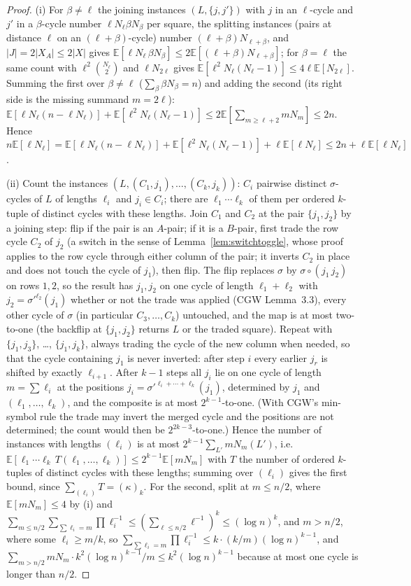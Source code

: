 \documentclass[11pt]{article}
\theoremstyle{definition}
\newcommand{\E}{\mathbb{E}}
\begin{document}
\begin{proof}
(i) For $\beta\ne\ell$ the joining instances $(L,\{j,j'\})$ with $j$ in
an $\ell$-cycle and $j'$ in a $\beta$-cycle number $\ell N_\ell\beta N_\beta$
per square, the splitting instances (pairs at distance $\ell$ on an
$(\ell+\beta)$-cycle) number $(\ell+\beta)N_{\ell+\beta}$, and
$|J|=2|X_A|\le2|X|$ gives
$\E[\ell N_\ell\,\beta N_\beta]\le2\E[(\ell+\beta)N_{\ell+\beta}]$; for
$\beta=\ell$ the same count with $\ell^2\binom{N_\ell}{2}$ and
$\ell N_{2\ell}$ gives $\E[\ell^2N_\ell(N_\ell-1)]\le4\ell\E[N_{2\ell}]$.
Summing the first over $\beta\ne\ell$ ($\sum_\beta\beta N_\beta=n$) and
adding the second (its right side is the missing summand $m=2\ell$):
$\E[\ell N_\ell(n-\ell N_\ell)]+\E[\ell^2N_\ell(N_\ell-1)]\le2\E[\sum_{m\ge\ell+2}mN_m]\le2n$.  Hence
$n\E[\ell N_\ell]=\E[\ell N_\ell(n-\ell N_\ell)]+\E[\ell^2N_\ell(N_\ell-1)]+\ell\E[\ell N_\ell]
\le2n+\ell\E[\ell N_\ell]$.

(ii) Count the instances $(L,(C_1,j_1),\dots,(C_k,j_k))$: $C_i$
pairwise distinct $\sigma$-cycles of $L$ of lengths $\ell_i$ and
$j_i\in C_i$; there are $\ell_1\cdots\ell_k$ of them per ordered
$k$-tuple of distinct cycles with these lengths.  Join $C_1$ and $C_2$
at the pair $\{j_1,j_2\}$ by a joining step: flip if the pair is an
$A$-pair; if it is a $B$-pair, first trade the row cycle $C_2$ of $j_2$
(a switch in the sense of Lemma~\ref{lem:switchtoggle}, whose proof
applies to the row cycle through either column of the pair; it inverts
$C_2$ in place and does not touch the cycle of $j_1$), then flip.  The
flip replaces $\sigma$ by $\sigma\circ(j_1\,j_2)$ on rows $1,2$, so
the result has $j_1,j_2$ on one cycle of length $\ell_1+\ell_2$ with
$j_2=\sigma'^{\ell_2}(j_1)$ whether or not the trade was applied
(CGW Lemma~3.3), every other cycle of $\sigma$ (in particular
$C_3,\dots,C_k$) untouched, and the map is at most two-to-one (the
backflip at $\{j_1,j_2\}$ returns $L$ or the traded square).  Repeat
with $\{j_1,j_3\}$, \dots, $\{j_1,j_k\}$, always trading the cycle of
the new column when needed, so that the cycle containing $j_1$ is never
inverted: after step $i$ every earlier $j_r$ is shifted by exactly
$\ell_{i+1}$.  After $k-1$ steps all $j_i$ lie on one cycle of length
$m=\sum\ell_i$ at the positions $j_i=\sigma'^{\ell_i+\cdots+\ell_k}(j_1)$,
determined by $j_1$ and $(\ell_1,\dots,\ell_k)$, and the composite is at
most $2^{k-1}$-to-one.  (With CGW's min-symbol rule the trade may
invert the merged cycle and the positions are not determined; the
count would then be $2^{2k-3}$-to-one.)  Hence the number of instances with lengths
$(\ell_i)$ is at most $2^{k-1}\sum_{L'}mN_m(L')$, i.e.\
$\E[\ell_1\cdots\ell_k\,T(\ell_1,\dots,\ell_k)]\le2^{k-1}\E[mN_m]$ with
$T$ the number of ordered $k$-tuples of distinct cycles with these
lengths; summing over $(\ell_i)$ gives the first bound, since
$\sum_{(\ell_i)}T=(\kappa)_k$.  For the second, split at $m\le n/2$,
where $\E[mN_m]\le4$ by (i) and
$\sum_{m\le n/2}\sum_{\sum\ell_i=m}\prod\ell_i^{-1}\le(\sum_{\ell\le n/2}\ell^{-1})^k\le(\log n)^k$,
and $m>n/2$, where some $\ell_i\ge m/k$, so
$\sum_{\sum\ell_i=m}\prod\ell_i^{-1}\le k\cdot(k/m)(\log n)^{k-1}$, and
$\sum_{m>n/2}mN_m\cdot k^2(\log n)^{k-1}/m\le k^2(\log n)^{k-1}$ because at
most one cycle is longer than $n/2$.


\end{proof}
\end{document}
